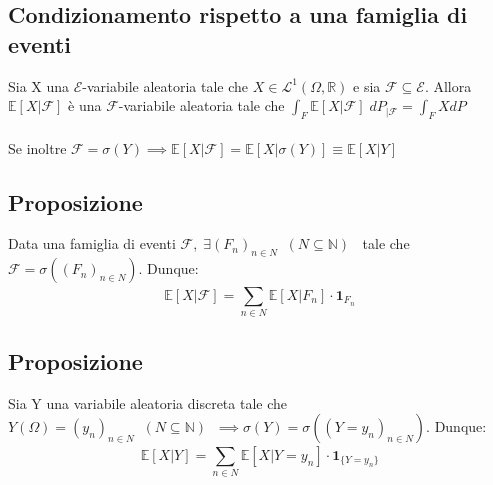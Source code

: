 \documentclass{article}
\begin{document}
\subsection*{Condizionamento rispetto a una famiglia di eventi}
Sia X una $\mathcal{E}$-variabile aleatoria tale che $X \in \mathcal{L}^{1}(\Omega, \mathbb{R})$ e sia $\mathcal{F} \subseteq \mathcal{E}$. Allora $\mathbb{E}[X|\mathcal{F}]$ è una $\mathcal{F}$-variabile aleatoria tale che $\int_{F}^{}\mathbb{E}[X|\mathcal{F}] \; dP_{|\mathcal{F}} = \int_{F}^{}X dP$\\
\\
Se inoltre $\mathcal{F} = \sigma(Y) \implies \mathbb{E}[X|\mathcal{F}] = \mathbb{E}[X|\sigma(Y)] \equiv \mathbb{E}[X|Y]$

\subsection*{Proposizione}
Data una famiglia di eventi $\mathcal{F}, \; \exists (F_{n})_{n \in N} \; \; (N \subseteq \mathbb{N}) \; \;$ tale che $\mathcal{F} = \sigma((F_{n})_{n \in N})$. Dunque:
\[ \mathbb{E}[X|\mathcal{F}] = \sum_{n \in N}^{} \mathbb{E}[X|F_{n}] \cdot \mathbf{1}_{F_{n}} \]

\subsection*{Proposizione}
Sia Y una variabile aleatoria discreta tale che $Y(\Omega) = (y_{n})_{n \in N} \; \; (N \subseteq \mathbb{N}) \; \; \implies \sigma(Y) = \sigma((Y=y_{n})_{n \in N})$. Dunque:
\[ \mathbb{E}[X|Y] = \sum_{n \in N}^{} \mathbb{E}[X|Y=y_{n}] \cdot \mathbf{1}_{\{Y=y_{n}\}} \]
\end{document}
